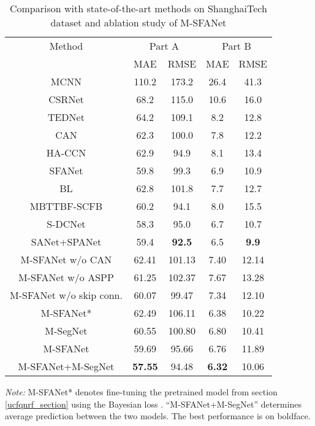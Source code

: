\documentclass[10pt, conference, a4paper]{IEEEtran}
\begin{document}
\setlength{\tabcolsep}{4pt}
\begin{table}
\begin{center}
\caption{Comparison with state-of-the-art methods on ShanghaiTech \cite{zhang2016single} dataset and ablation study of M-SFANet}
\begin{tabular}{c|c|c|c|c}
\hline
Method & \multicolumn{2}{c|}{Part A} & \multicolumn{2}{c}{Part B}\\ \cline{2-5}
 & MAE & RMSE & MAE & RMSE\\
\hline
MCNN \cite{zhang2016single} & 110.2 & 173.2 & 26.4 & 41.3\\
CSRNet \cite{li2018csrnet} & 68.2 & 115.0 & 10.6 & 16.0\\
TEDNet \cite{jiang2019crowd} & 64.2 & 109.1 & 8.2 & 12.8\\
CAN \cite{liu2019context} & 62.3 & 100.0 & 7.8 & 12.2\\
HA-CCN \cite{sindagi2019ha} & 62.9 & 94.9 & 8.1 & 13.4\\
SFANet \cite{zhu2019dual} & 59.8 & 99.3 & 6.9 & 10.9\\
BL \cite{ma2019bayesian} & 62.8 & 101.8 & 7.7 & 12.7\\
MBTTBF-SCFB \cite{sindagi2019multi} & 60.2 & 94.1 & 8.0 & 15.5\\
S-DCNet \cite{xiong2019open} & 58.3 & 95.0 & 6.7 & 10.7\\
SANet+SPANet \cite{he2015spatial} & 59.4 & \textbf{92.5} & 6.5 & \textbf{9.9}\\
\hline
M-SFANet w/o CAN \cite{liu2019context} & 62.41 & 101.13 & 7.40 & 12.14\\
M-SFANet w/o ASPP \cite{chen2017deeplab} & 61.25 & 102.37 & 7.67 & 13.28\\
M-SFANet w/o skip conn. & 60.07 & 99.47 & 7.34 & 12.10\\
M-SFANet* & 62.49 & 106.11 & 6.38 & 10.22\\
\hline
M-SegNet & 60.55 & 100.80 & 6.80 & 10.41\\
M-SFANet & 59.69 & 95.66 & 6.76 & 11.89\\
M-SFANet+M-SegNet & \textbf{57.55} & 94.48 & \textbf{6.32} & 10.06\\
\hline
\end{tabular}
\label{table:shbres}
\end{center}
\footnotesize\emph{Note:} M-SFANet* denotes fine-tuning the pretrained model from section \ref{ucfqnrf_section} using the Bayesian loss \cite{ma2019bayesian}. ``M-SFANet+M-SegNet'' determines average prediction between the two models. The best performance is on boldface.
\end{table}
\end{document}
